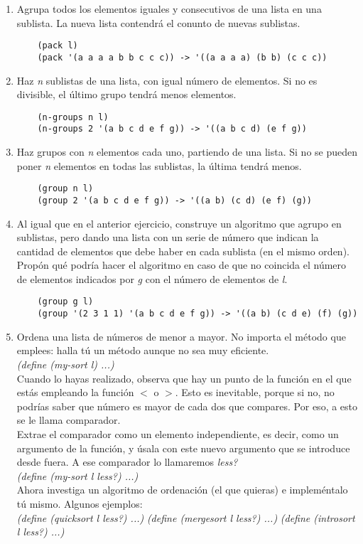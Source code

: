 \documentclass[11pt]{article}
\begin{document}
\begin{enumerate}
  \item Agrupa todos los elementos iguales y consecutivos de una lista en una sublista. La nueva lista contendrá el conunto de nuevas sublistas.
\begin{verbatim}
    (pack l)
    (pack '(a a a a b b c c c)) -> '((a a a a) (b b) (c c c))
\end{verbatim}

  \item Haz \textit{n} sublistas de una lista, con igual número de elementos. Si no es divisible, el último grupo tendrá menos elementos.
\begin{verbatim}
    (n-groups n l)
    (n-groups 2 '(a b c d e f g)) -> '((a b c d) (e f g))
\end{verbatim}

  \item Haz grupos con \textit{n} elementos cada uno, partiendo de una lista. Si no se pueden poner \textit{n} elementos en todas las sublistas, la última tendrá menos.
\begin{verbatim}
    (group n l)
    (group 2 '(a b c d e f g)) -> '((a b) (c d) (e f) (g))
\end{verbatim}

  \item Al igual que en el anterior ejercicio, construye un algoritmo que agrupo en sublistas, pero dando una lista con un serie de número que indican la cantidad de elementos que debe haber en cada sublista (en el mismo orden). Propón qué podría hacer el algoritmo en caso de que no coincida el número de elementos indicados por \textit{g} con el número de elementos de \textit{l}.
\begin{verbatim}
    (group g l)
    (group '(2 3 1 1) '(a b c d e f g)) -> '((a b) (c d e) (f) (g))
\end{verbatim}

  \item Ordena una lista de números de menor a mayor. No importa el método que emplees: halla tú un método aunque no sea muy eficiente.
    \\[3mm]
    \textit{(define (my-sort l) ...)}
    \\[3mm]
    Cuando lo hayas realizado, observa que hay un punto de la función en el que estás empleando la función $<$ o $>$. Esto es inevitable, porque si no, no podrías saber que número es mayor de cada dos que compares. Por eso, a esto se le llama comparador.
    \\[3mm]
    Extrae el comparador como un elemento independiente, es decir, como un argumento de la función, y úsala con este nuevo argumento que se introduce desde fuera. A ese comparador lo llamaremos \textit{less?}
    \\[3mm]
    \textit{(define (my-sort l less?) ...)}
    \\[3mm]
    Ahora investiga un algoritmo de ordenación (el que quieras) e impleméntalo tú mismo. Algunos ejemplos:
    \\[3mm]
    \textit{(define (quicksort l less?) ...)}
    \newline \textit{(define (mergesort l less?) ...)}
    \newline \textit{(define (introsort l less?) ...)}


\end{enumerate}
\end{document}

